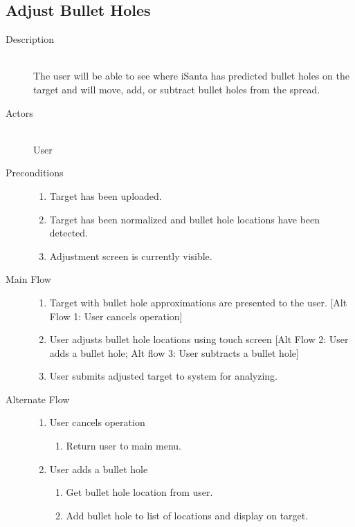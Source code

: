 \subsection{Adjust Bullet Holes}
\begin{description}
    \item[Description] \hfill \\
        The user will be able to see where iSanta has predicted bullet holes on the target and will move, add, or subtract bullet holes from the spread.
    \item[Actors] \hfill \\
        User
    \item[Preconditions] \hfill 
        \begin{enumerate}
            \item Target has been uploaded.
            \item Target has been normalized and bullet hole locations have been detected.
            \item Adjustment screen is currently visible.
        \end{enumerate}
    \item[Main Flow] \hfill 
        \begin{enumerate}
            \item Target with bullet hole approximations are presented to the user.
                [Alt Flow 1: User cancels operation]
            \item User adjusts bullet hole locations using touch screen 
                [Alt Flow 2: User adds a bullet hole; 
                Alt flow 3: User subtracts a bullet hole]
            \item User submits adjusted target to system for analyzing. 
        \end{enumerate}
    \item[Alternate Flow] \hfill 
        \begin{enumerate}
            \item User cancels operation 
                \begin{enumerate}
                    \item Return user to main menu. 
                \end{enumerate}
            \item User adds a bullet hole
                \begin{enumerate}
                    \item Get bullet hole location from user.
                    \item Add bullet hole to list of locations and display on target.

\end{enumerate}
\end{enumerate}
\end{description}
